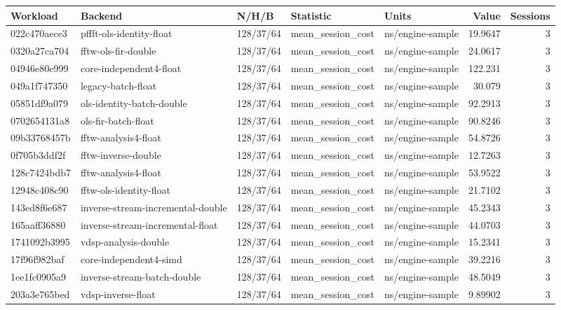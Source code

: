 \begingroup\scriptsize
\begin{longtable}{lllllrr}
Workload & Backend & N/H/B & Statistic & Units & Value & Sessions \\
\hline
022c470aece3 & pffft-ols-identity-float & 128/37/64 & mean\_session\_cost & ns/engine-sample & 19.9647 & 3 \\
0320a27ca704 & fftw-ols-fir-double & 128/37/64 & mean\_session\_cost & ns/engine-sample & 24.0617 & 3 \\
04946e80e999 & core-independent4-float & 128/37/64 & mean\_session\_cost & ns/engine-sample & 122.231 & 3 \\
049a1f747350 & legacy-batch-float & 128/37/64 & mean\_session\_cost & ns/engine-sample & 30.079 & 3 \\
05851df9a079 & ols-identity-batch-double & 128/37/64 & mean\_session\_cost & ns/engine-sample & 92.2913 & 3 \\
0702654131a8 & ols-fir-batch-float & 128/37/64 & mean\_session\_cost & ns/engine-sample & 90.8246 & 3 \\
09b33768457b & fftw-analysis4-float & 128/37/64 & mean\_session\_cost & ns/engine-sample & 54.8726 & 3 \\
0f705b3ddf2f & fftw-inverse-double & 128/37/64 & mean\_session\_cost & ns/engine-sample & 12.7263 & 3 \\
128c7424bdb7 & fftw-analysis4-float & 128/37/64 & mean\_session\_cost & ns/engine-sample & 53.9522 & 3 \\
12948c408c90 & fftw-ols-identity-float & 128/37/64 & mean\_session\_cost & ns/engine-sample & 21.7102 & 3 \\
143ed8f6e687 & inverse-stream-incremental-double & 128/37/64 & mean\_session\_cost & ns/engine-sample & 45.2343 & 3 \\
165aaff36880 & inverse-stream-incremental-float & 128/37/64 & mean\_session\_cost & ns/engine-sample & 44.0703 & 3 \\
1741092b3995 & vdsp-analysis-double & 128/37/64 & mean\_session\_cost & ns/engine-sample & 15.2341 & 3 \\
17f96f982baf & core-independent4-simd & 128/37/64 & mean\_session\_cost & ns/engine-sample & 39.2216 & 3 \\
1ee1fc0905a9 & inverse-stream-batch-double & 128/37/64 & mean\_session\_cost & ns/engine-sample & 48.5049 & 3 \\
203a3e765bed & vdsp-inverse-float & 128/37/64 & mean\_session\_cost & ns/engine-sample & 9.89902 & 3 \\

\end{longtable}
